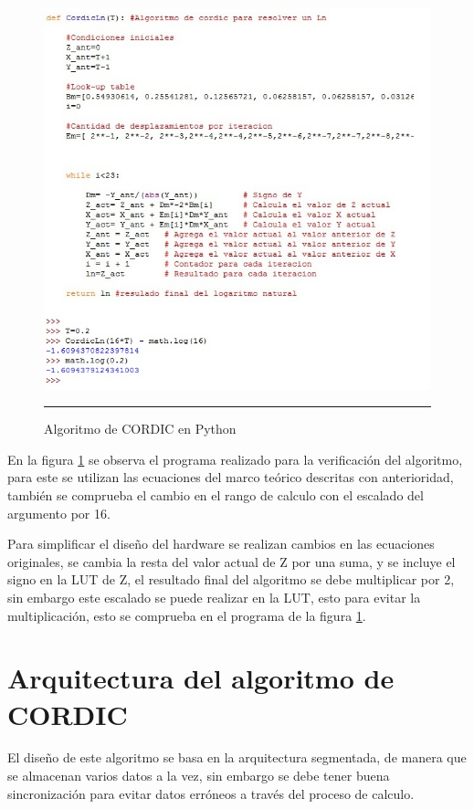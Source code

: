 \begin{figure}[H]
  \centering
    \includegraphics[scale=0.6]{./Progra_Cordic.jpg}
    \rule{35em}{0.5pt}
  \caption[Algoritmo de CORDIC en Python]{Algoritmo de CORDIC en Python  }
  \label{fig:Python}
\end{figure}


En la figura \ref{fig:Python} se observa el programa realizado para la verificación del algoritmo, para este se utilizan las ecuaciones del marco teórico descritas con anterioridad, también se comprueba el cambio en el rango de calculo con el escalado del argumento por 16. 

Para simplificar el diseño del hardware se realizan cambios en las ecuaciones originales, se cambia la resta del valor actual de Z por una suma, y se incluye el signo en la LUT de Z, el resultado final del algoritmo se debe multiplicar por 2, sin embargo este escalado se puede realizar en la LUT, esto para evitar la multiplicación, esto se comprueba en el programa de la figura \ref{fig:Python}.  


\section{Arquitectura del algoritmo de CORDIC}

El diseño de este algoritmo se basa en la arquitectura segmentada, de manera que se almacenan varios datos a la vez, sin embargo se debe tener buena sincronización para evitar datos erróneos a través del proceso de calculo. 

